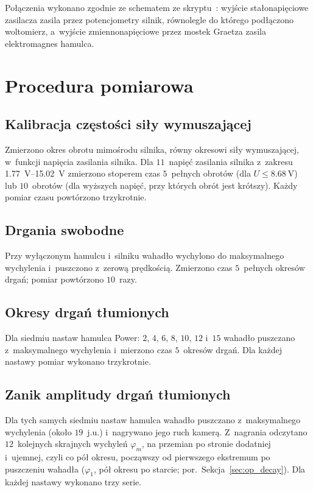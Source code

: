 \documentclass[12pt, a4paper]{article}
\begin{document}
Połączenia wykonano zgodnie ze schematem ze skryptu~\cite{skrypt}: wyjście
stałonapięciowe zasilacza zasila przez potencjometry silnik, równolegle do którego
podłączono woltomierz, a~wyjście zmiennonapięciowe przez mostek Graetza zasila
elektromagnes hamulca.

\section{Procedura pomiarowa}

\subsection{Kalibracja częstości siły wymuszającej}\label{sec:proc_calibration}

Zmierzono okres obrotu mimośrodu silnika, równy okresowi siły wymuszającej,
w~funkcji napięcia zasilania silnika. Dla $11$~napięć
zasilania silnika z~zakresu \SIrange{1.77}{15.02}{\volt} zmierzono stoperem czas
$5$~pełnych obrotów (dla $U \leq \SI{8.68}{\volt}$) lub $10$~obrotów (dla wyższych
napięć, przy których obrót jest krótszy). Każdy pomiar czasu powtórzono trzykrotnie.

\subsection{Drgania swobodne}\label{sec:proc_free}

Przy wyłączonym hamulcu i~silniku wahadło wychylono do maksymalnego wychylenia
i~puszczono z~zerową prędkością. Zmierzono czas $5$~pełnych okresów drgań;
pomiar powtórzono $10$~razy.

\subsection{Okresy drgań tłumionych}\label{sec:proc_damped_periods}

Dla siedmiu nastaw hamulca Power: $2$, $4$, $6$, $8$, $10$, $12$ i~$15$ wahadło
puszczano z~maksymalnego wychylenia i~mierzono czas $5$~okresów drgań.
Dla każdej nastawy pomiar wykonano trzykrotnie.

\subsection{Zanik amplitudy drgań tłumionych}\label{sec:proc_decay}

Dla tych samych siedmiu nastaw hamulca wahadło puszczano z~maksymalnego
wychylenia (około $19$~j.u.) i~nagrywano jego ruch kamerą. Z~nagrania odczytano
$12$~kolejnych skrajnych wychyleń $\varphi_m$, na przemian po stronie dodatniej
i~ujemnej, czyli co pół okresu, począwszy od pierwszego ekstremum po puszczeniu
wahadła ($\varphi_1$, pół okresu po starcie; por.\ Sekcja~\ref{sec:op_decay}).
Dla każdej nastawy wykonano trzy serie.
\end{document}
